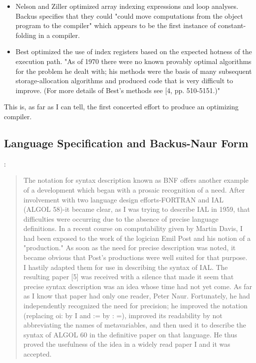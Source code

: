 \begin{itemize}
	\item Nelson and Ziller optimized array indexing expressions and
	      loop analyses.
	      Backus specifies that they could "could move computations from the object
	      program to the compiler" which appears to be the first instance of
	      constant-folding in a compiler.
	\item Best optimized the use of index registers based on the
	      expected hotness of the
	      execution path. "As of 1970 there were no known provably optimal
	      algorithms for
	      the problem he dealt with; his methods were the basis of many subsequent
	      storage-allocation algorithms and produced code that is very difficult to
	      improve. (For more details of Best's methods see [4, pp. 510-5151.)"
\end{itemize}

This is, as far as I can tell, the first concerted effort to produce an
optimizing compiler.

\subsection{Language Specification and Backus-Naur Form}

\cite{Backus_1980_Programming_in_America_in_1950s}:
\begin{quotation}
	The notation for syntax description known as BNF offers another example of a
	development which began with a prosaic recognition of a need.
	After involvement
	with two language design efforts-FORTRAN and IAL (ALGOL 58)-it
	became clear, as
	I was trying to describe IAL in 1959, that difficulties were
	occurring due to
	the absence of precise language definitions. In a recent course on
	computability given by Martin Davis, I had been exposed to the work of the
	logician Emil Post and his notion of a "production." As soon as the need for
	precise description was noted, it became obvious that Post's
	productions were
	well suited for that purpose. I hastily adapted them for use in
	describing the
	syntax of IAL. The resulting paper [5] was received with a
	silence that made it
	seem that precise syntax description was an idea whose time had
	not yet come.
	As far as I know that paper had only one reader, Peter Naur. Fortunately, he
	had independently recognized the need for precision; he improved
	the notation
	(replacing oi: by I and := by : =), improved its readability by not
	abbreviating the names of metavariables, and then used it to describe the
	syntax of ALGOL 60 in the definitive paper on that language. He
	thus proved the
	usefulness of the idea in a widely read paper I and it was accepted.
\end{quotation}

